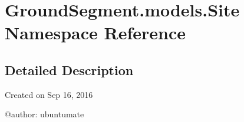 \hypertarget{namespace_ground_segment_1_1models_1_1_site}{}\section{Ground\+Segment.\+models.\+Site Namespace Reference}
\label{namespace_ground_segment_1_1models_1_1_site}


\subsection{Detailed Description}
\begin{DoxyVerb}Created on Sep 16, 2016

@author: ubuntumate
\end{DoxyVerb}
 